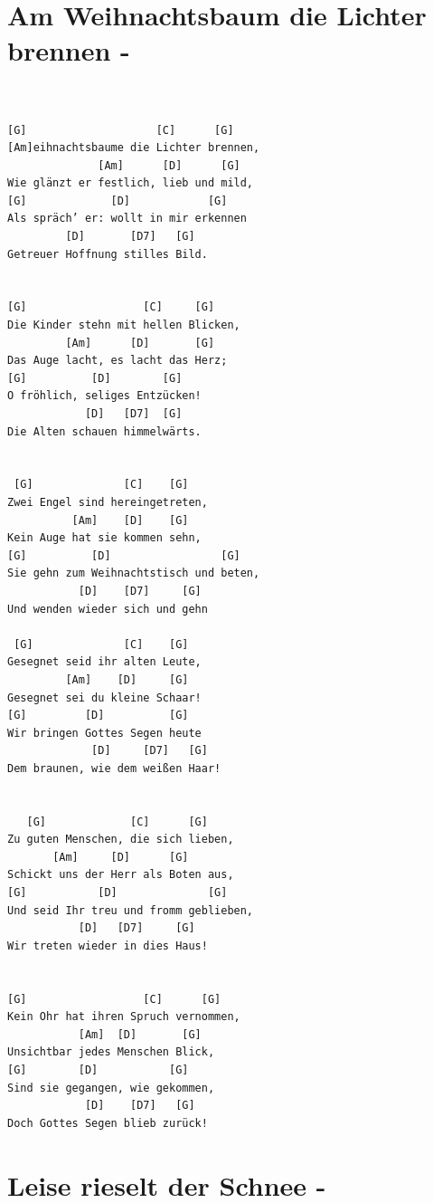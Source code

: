\documentclass[
]{book}
\let\stdsection\section
\renewcommand\section{\clearpage\stdsection}
\begin{document}
\hypertarget{am-weihnachtsbaum-die-lichter-brennen--}{%
\section{Am Weihnachtsbaum die Lichter brennen -}\label{am-weihnachtsbaum-die-lichter-brennen--}}

\begin{verbatim}


[G]                    [C]      [G]
[Am]eihnachtsbaume die Lichter brennen,
              [Am]      [D]      [G]
Wie glänzt er festlich, lieb und mild,
[G]             [D]            [G]
Als spräch’ er: wollt in mir erkennen
         [D]       [D7]   [G]
Getreuer Hoffnung stilles Bild.


[G]                  [C]     [G]
Die Kinder stehn mit hellen Blicken,
         [Am]      [D]       [G]
Das Auge lacht, es lacht das Herz;
[G]          [D]        [G]
O fröhlich, seliges Entzücken!
            [D]   [D7]  [G]
Die Alten schauen himmelwärts.


 [G]              [C]    [G]
Zwei Engel sind hereingetreten,
          [Am]    [D]    [G]
Kein Auge hat sie kommen sehn,
[G]          [D]                 [G]
Sie gehn zum Weihnachtstisch und beten,
           [D]    [D7]     [G]
Und wenden wieder sich und gehn
 
 [G]              [C]    [G]
Gesegnet seid ihr alten Leute,
         [Am]    [D]     [G]
Gesegnet sei du kleine Schaar!
[G]         [D]          [G]
Wir bringen Gottes Segen heute
             [D]     [D7]   [G]
Dem braunen, wie dem weißen Haar!


   [G]             [C]      [G]
Zu guten Menschen, die sich lieben,
       [Am]     [D]      [G]
Schickt uns der Herr als Boten aus,
[G]           [D]              [G]
Und seid Ihr treu und fromm geblieben,
           [D]   [D7]     [G]
Wir treten wieder in dies Haus!
 

[G]                  [C]      [G]
Kein Ohr hat ihren Spruch vernommen,
           [Am]  [D]       [G]
Unsichtbar jedes Menschen Blick,
[G]        [D]           [G]
Sind sie gegangen, wie gekommen,
            [D]    [D7]   [G]
Doch Gottes Segen blieb zurück!
\end{verbatim}

\hypertarget{leise-rieselt-der-schnee--}{%
\section{Leise rieselt der Schnee -}\label{leise-rieselt-der-schnee--}}
\end{document}
